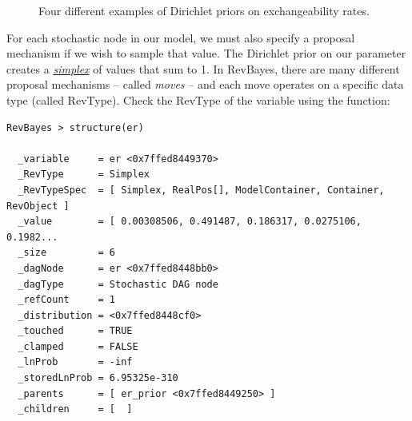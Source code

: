 \begin{figure}[h!]
\centering
{}
\caption{\small Four different examples of Dirichlet priors on exchangeability rates.}
\label{dirichletFig}
\end{figure}

For each stochastic node in our model, we must also specify a proposal mechanism if we wish to sample that value. 
The Dirichlet prior on our parameter  creates a \href{http://en.wikipedia.org/wiki/Simplex}{\textit{simplex}} of values that sum to 1. 
In RevBayes, there are many different proposal mechanisms -- called \textit{moves} -- and each move operates on a specific data type (called RevType). 
Check the RevType of the variable  using the  function:
{\tt \small \begin{snugshade*}
\begin{lstlisting}
RevBayes > structure(er)

  _variable     = er <0x7ffed8449370>
  _RevType      = Simplex
  _RevTypeSpec  = [ Simplex, RealPos[], ModelContainer, Container, RevObject ]
  _value        = [ 0.00308506, 0.491487, 0.186317, 0.0275106, 0.1982...
  _size         = 6
  _dagNode      = er <0x7ffed8448bb0>
  _dagType      = Stochastic DAG node
  _refCount     = 1
  _distribution = <0x7ffed8448cf0>
  _touched      = TRUE
  _clamped      = FALSE
  _lnProb       = -inf
  _storedLnProb = 6.95325e-310
  _parents      = [ er_prior <0x7ffed8449250> ]
  _children     = [  ]
\end{lstlisting}
\end{snugshade*}}

